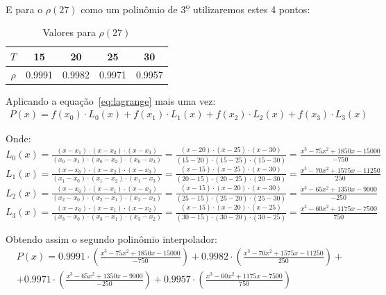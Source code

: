 \documentclass[12pt, hidelinks]{article}
\begin{document}
E para o $\rho(27)$ como um polinômio de 3\textsuperscript{\b{o}} utilizaremos estes 4 pontos:

\begin{table}[h]
  \centering
  \begin{tabular}{|c|c|c|c|c|}
    \hline
      $T$ & 15 & 20 & 25 & 30\\
    \hline
      $\rho$ & 0.9991 & 0.9982 & 0.9971 & 0.9957\\
    \hline
  \end{tabular}
  \caption{Valores para $\rho(27)$}
  \label{tab:val27}
\end{table}

Aplicando a equação~\eqref{eq:lagrange} mais uma vez:
\begin{eqnarray}\label{eq:pn}
  P(x) = f(x_0)\cdot L_0(x) + f(x_1)\cdot L_1(x) + f(x_2)\cdot L_2(x) + f(x_3)\cdot L_3(x)
\end{eqnarray}

Onde: \\
$L_0(x) = \frac{(x - x_1)\cdot(x - x_2)\cdot(x - x_3)}{(x_0 - x_1)\cdot(x_0 - x_2)\cdot(x_0 - x_3)} = \frac{(x - 20)\cdot(x - 25)\cdot(x - 30)}{(15 - 20)\cdot(15 - 25)\cdot(15 - 30)} = \frac{x^3 - 75x^2 + 1850x - 15000}{-750}$\\
$L_1(x) = \frac{(x - x_0)\cdot(x - x_2)\cdot(x - x_3)}{(x_1 - x_0)\cdot(x_1 - x_2)\cdot(x_1 - x_3)} = \frac{(x - 15)\cdot(x - 25)\cdot(x - 30)}{(20 - 15)\cdot(20 - 25)\cdot(20 - 30)} = \frac{x^3 - 70x^2 + 1575x - 11250}{250}$\\
$L_2(x) = \frac{(x - x_0)\cdot(x - x_1)\cdot(x - x_3)}{(x_2 - x_0)\cdot(x_2 - x_1)\cdot(x_2 - x_3)} = \frac{(x - 15)\cdot(x - 20)\cdot(x - 30)}{(25 - 15)\cdot(25 - 20)\cdot(25 - 30)} = \frac{x^3 - 65x^2 + 1350x - 9000}{-250}$\\
$L_3(x) = \frac{(x - x_0)\cdot(x - x_1)\cdot(x - x_2)}{(x_3 - x_0)\cdot(x_3 - x_1)\cdot(x_3 - x_2)} = \frac{(x - 15)\cdot(x - 20)\cdot(x - 25)}{(30 - 15)\cdot(30 - 20)\cdot(30 - 25)} = \frac{x^3 - 60x^2 + 1175x - 7500}{750}$

Obtendo assim o segundo polinômio interpolador:
\begin{eqnarray}\label{eq:pi2}
  P(x) = 0.9991 \cdot \left(\frac{x^3 - 75x^2 + 1850x - 15000}{-750}\right) + 0.9982 \cdot \left(\frac{x^3 - 70x^2 + 1575x - 11250}{250}\right) + \nonumber \\
  + 0.9971 \cdot \left(\frac{x^3 - 65x^2 + 1350x - 9000}{-250}\right) + 0.9957 \cdot \left(\frac{x^3 - 60x^2 + 1175x - 7500}{750}\right)
\end{eqnarray}
\end{document}
